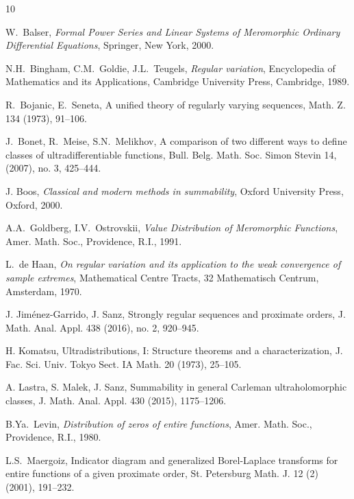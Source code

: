 \documentclass[11pt,a4paper]{article}
\theoremstyle{definition}
\begin{document}
\begin{thebibliography}{10}


 W.~Balser, \emph{Formal Power Series and Linear Systems of Meromorphic Ordinary Differential Equations},
Springer, New York, 2000.


 N.H.~Bingham, C.M.~Goldie, J.L.~Teugels, \emph{Regular variation}, Encyclopedia of Mathematics and
its Applications, Cambridge University Press, Cambridge, 1989.

 R.~Bojanic, E.~Seneta, A unified theory of regularly varying sequences, Math. Z. 134 (1973), 91--106.

 J.~Bonet, R.~Meise, S.N.~Melikhov,  A comparison of two different ways to define
classes of ultradifferentiable functions, Bull. Belg. Math. Soc. Simon Stevin 14, (2007), no. 3, 425--444.

 J. Boos, \emph{Classical and modern methods in summability}, Oxford University Press, Oxford, 2000.



A.A.~Goldberg, I.V.~Ostrovskii,
\emph{Value Distribution of Meromorphic Functions},
Amer. Math. Soc., Providence, R.I., 1991.



 L.~de Haan, \emph{On regular variation and its application to the weak convergence of sample extremes},
Mathematical Centre Tracts, 32 Mathematisch Centrum, Amsterdam, 1970.



 J. Jim\'enez-Garrido, J. Sanz, Strongly regular sequences and proximate orders, J. Math. Anal. Appl. 438 (2016), no. 2, 920--945.


 H. Komatsu, Ultradistributions, I: Structure theorems and a characterization,
J. Fac. Sci. Univ. Tokyo Sect. IA Math.  20 (1973), 25--105.


 A. Lastra, S. Malek, J. Sanz, Summability in general Carleman ultraholomorphic
classes, J. Math. Anal. Appl. 430 (2015), 1175--1206.


 B.Ya.~Levin, \emph{Distribution of zeros of entire functions}, Amer. Math. Soc., Providence, R.I., 1980.

 L.S.~Maergoiz,
Indicator diagram and generalized Borel-Laplace transforms for entire functions of a given proximate order,
St. Petersburg Math. J. 12 (2) (2001), 191--232.


\end{thebibliography}
\end{document}
